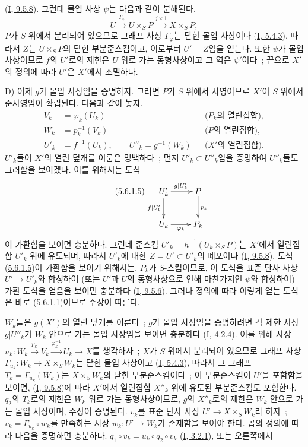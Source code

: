 
(\hyperref[I.9.5.8-ko]{I, 9.5.8}). 그런데 몰입 사상 $\psi$는 다음과
같이 분해된다.
\[
U\xrightarrow{\Gamma_\varphi}U\times_SP\xrightarrow{j\times1}X\times_SP,
\]
$P$가 $S$ 위에서 분리되어 있으므로 그래프 사상 $\Gamma_\varphi$는
닫힌 몰입 사상이다 (\hyperref[I.5.4.3-ko]{I, 5.4.3}). 따라서 $Z$는
$U\times_SP$의 닫힌 부분준스킴이고, 이로부터 $U'=Z$임을 얻는다. 또한
$\psi$가 몰입 사상이므로 $f$의 $U'$로의 제한은 $U$ 위로 가는
동형사상이고 그 역은 $\psi'$이다~; 끝으로 $X'$의 정의에 따라 $U'$은
$X'$에서 조밀하다.

D) 이제 $g$가 몰입 사상임을 증명하자. 그러면 $P$가 $S$ 위에서
사영이므로 $X'$이 $S$ 위에서 준사영임이 확립된다. 다음과 같이 놓자.
\begin{align*}
V_k&=\varphi_k(U_k) &&\text{($P_k$의 열린집합)},\\
W_k&=p_k^{-1}(V_k) &&\text{($P$의 열린집합)},\\
U'_k&=f^{-1}(U_k),\qquad U''_k=g^{-1}(W_k)
&&\text{($X'$의 열린집합)}.
\end{align*}
$U'_k$들이 $X'$의 열린 덮개를 이룸은 명백하다~; 먼저
$U'_k\subset U''_k$임을 증명하여 $U''_k$들도 그러함을 보이겠다. 이를
위해서는 도식
\[
\tag{5.6.1.5}
\label{II.5.6.1.5-ko}
\xymatrix{
U'_k\ar[r]^{g|U'_k}\ar[d]_{f|U'_k} & P\ar[d]^{p_k}\\
U_k\ar[r]_{\varphi_k} & P_k
}
\]
이 가환함을 보이면 충분하다. 그런데 준스킴
$U'_k=h^{-1}(U_k\times_SP)$는 $X'$에서 열린집합 $U'_k$ 위에 유도되며,
따라서 $U'_k$에 대한 $Z=U'\subset U'_k$의 폐포이다
(\hyperref[I.9.5.8-ko]{I, 9.5.8}). 도식
(\hyperref[II.5.6.1.5-ko]{5.6.1.5})이 가환함을 보이기 위해서는,
$P_k$가 $S$-스킴이므로, 이 도식을 표준 단사 사상 $U'\to U'_k$와
합성하여 (또는 $U'$과 $U$의 동형사상으로 인해 마찬가지인 $\psi$와
합성하여) 가환 도식을 얻음을 보이면 충분하다
(\hyperref[I.9.5.6-ko]{I, 9.5.6}). 그러나 정의에 따라 이렇게 얻는
도식은 바로 (\hyperref[II.5.6.1.1-ko]{5.6.1.1})이므로 주장이 따른다.

$W_k$들은 $g(X')$의 열린 덮개를 이룬다~; $g$가 몰입 사상임을
증명하려면 각 제한 사상 $g|U''_k$가 $W_k$ 안으로 가는 몰입 사상임을
보이면 충분하다 (\hyperref[I.4.2.4-ko]{I, 4.2.4}). 이를 위해 사상
$u_k:W_k\xrightarrow{p_k}V_k\xrightarrow{\varphi_k^{-1}}U_k\to X$를
생각하자~; $X$가 $S$ 위에서 분리되어 있으므로 그래프 사상
$\Gamma_{u_k}:W_k\to X\times_SW_k$는 닫힌 몰입 사상이고
(\hyperref[I.5.4.3-ko]{I, 5.4.3}), 따라서 그 그래프
$T_k=\Gamma_{u_k}(W_k)$는 $X\times_SW_k$의 닫힌 부분준스킴이다~;
이 부분준스킴이 $U'$을 포함함을 보이면,
(\hyperref[I.9.5.8-ko]{I, 9.5.8})에 따라 $X'$에서 열린집합 $X''_k$ 위에
유도된 부분준스킴도 포함한다. $q_2$의 $T_k$로의 제한은 $W_k$ 위로
가는 동형사상이므로, $g$의 $X''_k$로의 제한은 $W_k$ 안으로 가는 몰입
사상이며, 주장이 증명된다. $v_k$를 표준 단사 사상
$U'\to X\times_SW_k$라 하자~; $v_k=\Gamma_{u_k}\circ w_k$를 만족하는
사상 $w_k:U'\to W_k$가 존재함을 보여야 한다. 곱의 정의에 따라 다음을
증명하면 충분하다.
$q_1\circ v_k=u_k\circ q_2\circ v_k$
(\hyperref[I.3.2.1-ko]{I, 3.2.1}), 또는 오른쪽에서

